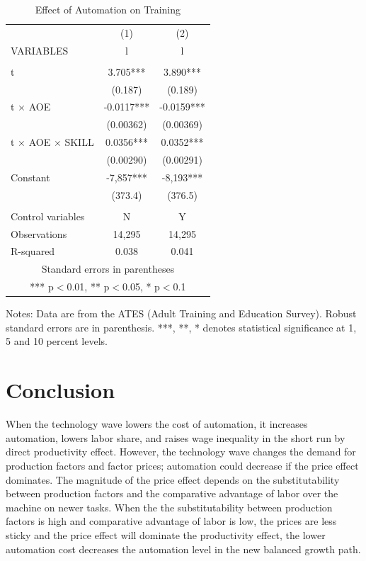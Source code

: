\documentclass[12pt]{article}
\begin{document}
\begin{table}[h!]
\begin{center}
\scriptsize
\begin{tabular}{lcc} \hline
 & (1) & (2) \\
VARIABLES & l & l \\ \hline
 &  &  \\
t & 3.705*** & 3.890*** \\
 & (0.187) & (0.189) \\
t $\times$ AOE & -0.0117*** & -0.0159*** \\
 & (0.00362) & (0.00369) \\
t $\times$ AOE $\times$ SKILL & 0.0356*** & 0.0352*** \\
 & (0.00290) & (0.00291) \\
Constant & -7,857*** & -8,193*** \\
 & (373.4) & (376.5) \\
 &  &  \\
 Control variables & N & Y \\
Observations & 14,295 & 14,295 \\
 R-squared & 0.038 & 0.041 \\ \hline
\multicolumn{3}{c}{ Standard errors in parentheses} \\
\multicolumn{3}{c}{ *** p$<$0.01, ** p$<$0.05, * p$<$0.1} \\
\end{tabular}
\end{center}
\caption{Effect of Automation on Training}
\label{estimation4}
{\scriptsize Notes: Data are from the ATES (Adult Training and Education Survey). Robust standard errors are in parenthesis. ***, **, * denotes statistical significance at 1, 5 and 10 percent levels.}
\end{table}

\section{Conclusion}

When the technology wave lowers the cost of automation, it increases automation, lowers labor share, and raises wage inequality in the short run by direct productivity effect. However, the technology wave changes the demand for production factors and factor prices; automation could decrease if the price effect dominates. The magnitude of the price effect depends on the substitutability between production factors and the comparative advantage of labor over the machine on newer tasks. When the the substitutability between production factors is high and comparative advantage of labor is low, the prices are less sticky and the price effect will dominate the productivity effect, the lower automation cost decreases the automation level in the new balanced growth path. 
\end{document}
